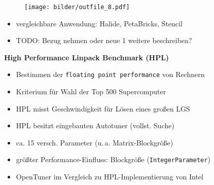   \begin{frame}
      \begin{figure}[ht]
      \centering	      
      \texttt{[image: bilder/outfile\_8.pdf]}
      \label{gccResults}
    \end{figure}
  \end{frame} 
  
  
 \begin{frame}
   \begin{itemize}
     \item vergleichbare Anwendung: Halide, PetaBricks, Stencil
     \item TODO: Bezug nehmen oder neue 1 weitere beschreiben?
   \end{itemize}
 \end{frame}
 
\begin{frame}
  \textbf{High Performance Linpack Benchmark (HPL)}
  \begin{itemize}
    \item Bestimmen der \texttt{floating point performance} von Rechnern
    
    \item Kriterium für Wahl der Top 500 Supercomputer
    \item HPL misst Geschwindigkeit für Lösen eines großen LGS
    
    \item HPL besitzt eingebauten Autotuner (vollst. Suche)
    
    \item ca. 15 versch. Parameter (u.\,a. Matrix-Blockgröße)
    \item größter Performance-Einfluss: Blockgröße (\texttt{IntegerParameter})
    
    
    \item OpenTuner im Vergleich zu HPL-Implementierung von Intel
    
  \end{itemize}  
\end{frame}

